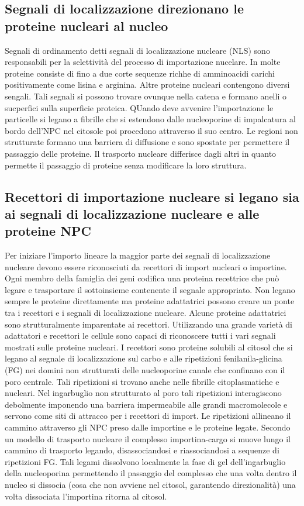 \subsection{Segnali di localizzazione direzionano le proteine nucleari al nucleo}
Segnali di ordinamento detti segnali di localizzazione nucleare (NLS) sono responsabili per la selettivit\`a del processo di importazione nucelare. In molte proteine consiste di fino a
due corte sequenze richhe di amminoacidi carichi positivamente come lisina e arginina. Altre proteine nucleari contengono diversi sengali. Tali segnali si possono trovare ovunque nella
catena e formano anelli o sucperfici sulla superficie proteica. QUando deve avvenire l'importazione le particelle si legano a fibrille che si estendono dalle nucleoporine di impalcatura
al bordo dell'NPC nel citosole poi procedono attraverso il suo centro. Le regioni non strutturate formano una barriera di diffusione e sono spostate per permettere il passaggio delle
proteine. Il trasporto nucleare differisce dagli altri in quanto permette il passaggio di proteine senza modificare la loro struttura.
\subsection{Recettori di importazione nucleare si legano sia ai segnali di localizzazione nucleare e alle proteine NPC}
Per iniziare l'importo lineare la maggior parte dei segnali di localizzazione nucleare devono essere riconosciuti da recettori di import nucleari o importine. Ogni membro della famiglia
dei geni codifica una proteina recettrice che pu\`o legare e trasportare il sottoinsieme contenente il segnale appropriato. Non legano sempre le proteine direttamente ma proteine 
adattatrici possono creare un ponte tra i recettori e i segnali di localizzazione nucleare. Alcune proteine adattatrici sono strutturalmente imparentate ai recettori. Utilizzando una
grande variet\`a di adattatori e recettori le cellule sono capaci di riconoscere tutti i vari segnali mostrati sulle proteine nucleari. I recettori sono proteine solubili al citosol che
si legano al segnale di localizzazione sul carbo e alle ripetizioni fenilanila-glicina (FG) nei domini non strutturati delle nucleoporine canale che confinano con il poro centrale. Tali
ripetizioni si trovano anche nelle fibrille citoplasmatiche e nucleari. Nel ingarbuglio non strutturato al poro tali ripetizioni interagiscono debolmente imponendo una barriera 
impermeabile alle grandi macromolecole e servono come siti di attracco per i recettori di import. Le ripetizioni allineano il cammino attraverso gli NPC preso dalle importine e le 
proteine legate. Secondo un modello di trasporto nucleare il complesso importina-cargo si muove lungo il cammino di trasporto legando, disassociandosi e riassociandosi a sequenze di
ripetizioni FG. Tali legami dissolvono localmente la fase di gel dell'ingarbuglio della nucleoporina  permettendo il passaggio del complesso che una volta dentro il nucleo si dissocia
(cosa che non avviene nel citosol, garantendo direzionalit\`a) una volta dissociata l'importina ritorna al citosol.

